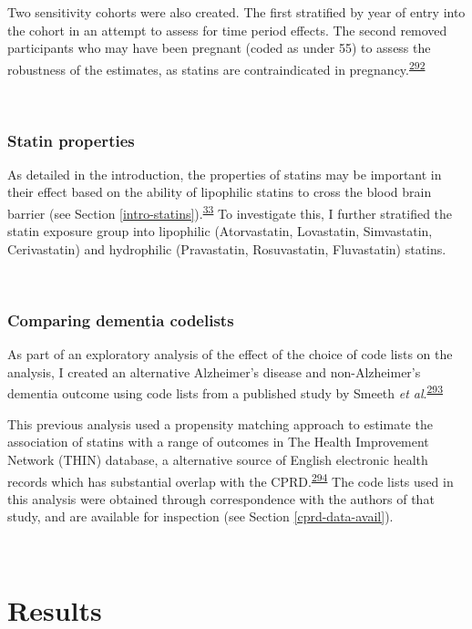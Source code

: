 \documentclass[a4paper, twoside]{templates/ociamthesis}
\begin{document}
Two sensitivity cohorts were also created. The first stratified by year of entry into the cohort in an attempt to assess for time period effects. The second removed participants who may have been pregnant (coded as under 55) to assess the robustness of the estimates, as statins are contraindicated in pregnancy.\textsuperscript{\protect\hyperlink{ref-karalis2016}{292}}

~

\hypertarget{statin-properties}{%
\subsubsection{Statin properties}\label{statin-properties}}

As detailed in the introduction, the properties of statins may be important in their effect based on the ability of lipophilic statins to cross the blood brain barrier (see Section \ref{intro-statins}).\textsuperscript{\protect\hyperlink{ref-sierra2011}{33}} To investigate this, I further stratified the statin exposure group into lipophilic (Atorvastatin, Lovastatin, Simvastatin, Cerivastatin) and hydrophilic (Pravastatin, Rosuvastatin, Fluvastatin) statins.

~

\hypertarget{comparing-dementia-codelists}{%
\subsubsection{Comparing dementia codelists}\label{comparing-dementia-codelists}}

As part of an exploratory analysis of the effect of the choice of code lists on the analysis, I created an alternative Alzheimer's disease and non-Alzheimer's dementia outcome using code lists from a published study by Smeeth \emph{et al}.\textsuperscript{\protect\hyperlink{ref-smeeth2009}{293}}

This previous analysis used a propensity matching approach to estimate the association of statins with a range of outcomes in The Health Improvement Network (THIN) database, a alternative source of English electronic health records which has substantial overlap with the CPRD.\textsuperscript{\protect\hyperlink{ref-carbonari2015}{294}} The code lists used in this analysis were obtained through correspondence with the authors of that study, and are available for inspection (see Section \ref{cprd-data-avail}).

~

\hypertarget{results-1}{%
\section{Results}\label{results-1}}
\end{document}
